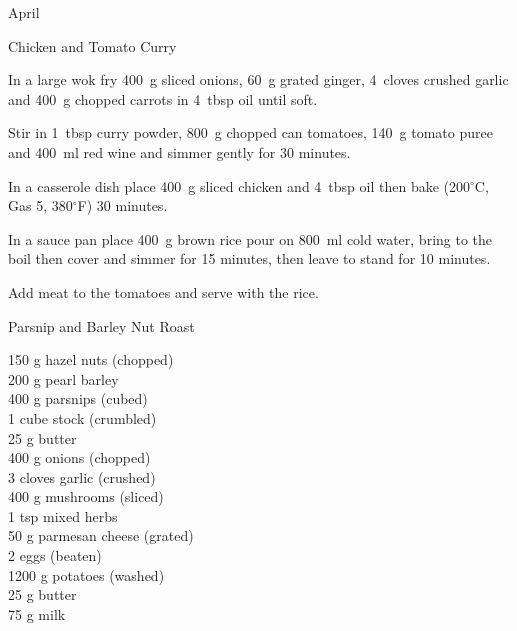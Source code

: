\begin{menu}{April}
\begin{recipe}{2}{Chicken and Tomato Curry}
	
    \begin{instructions}
    \item 
        In a large wok fry
        400~g sliced onions,
        60~g grated ginger,
        4~cloves crushed garlic
        and
        400~g chopped carrots
        in
        4~tbsp  oil
        until soft.
      \item 
        Stir in
        1~tbsp  curry powder,
        800~g chopped can tomatoes,
        140~g  tomato puree
        and
        400~ml  red wine
        and simmer gently for 30 minutes.
      \item 
        In a casserole dish place
        400~g sliced chicken
        and
        4~tbsp  oil
        then bake (200$^{\circ}$C, Gas 5, 380$^{\circ}$F) 30 minutes.
      \item 
    In a
    sauce pan
    place
    400~g  brown rice
    pour on
    800~ml  cold water,
    bring to the boil then cover and simmer for 15 minutes,
    then leave to stand for 10 minutes.
  \item 
        Add meat to the tomatoes and serve with the rice.
      
    \end{instructions}
    \end{recipe}%
  
    \begin{recipe}{2}{Parsnip and Barley Nut Roast}%
		\begin{ingredients}
		150 g hazel nuts (chopped) \\
	200 g pearl barley  \\
	400 g parsnips (cubed) \\
	1 cube stock (crumbled) \\
	25 g butter  \\
	400 g onions (chopped) \\
	3 cloves garlic (crushed) \\
	400 g mushrooms (sliced) \\
	1 tsp mixed herbs  \\
	50 g parmesan cheese (grated) \\
	2  eggs (beaten) \\
	1200 g potatoes (washed) \\
	25 g butter  \\
	75 g milk  \\
	
		\end{ingredients}
	

\end{recipe}
\end{menu}
